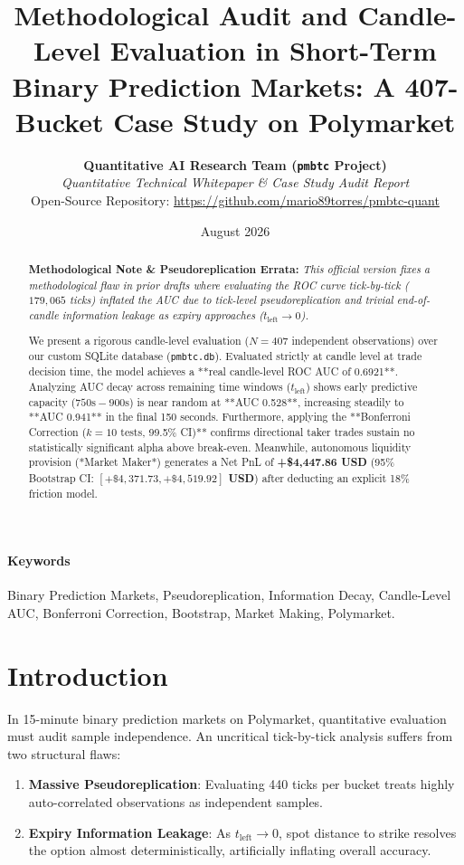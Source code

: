 \documentclass[10pt,twocolumn]{article}
\title{\textbf{Methodological Audit and Candle-Level Evaluation in Short-Term Binary Prediction Markets: A 407-Bucket Case Study on Polymarket}}
\author{\textbf{Quantitative AI Research Team (\texttt{pmbtc} Project)} \\
\textit{Quantitative Technical Whitepaper \& Case Study Audit Report} \\
Open-Source Repository: \url{https://github.com/mario89torres/pmbtc-quant}}
\date{August 2026}
\begin{document}
\maketitle

\begin{abstract}
\noindent \textbf{Methodological Note \& Pseudoreplication Errata:} \textit{This official version fixes a methodological flaw in prior drafts where evaluating the ROC curve tick-by-tick ($179,065$ ticks) inflated the AUC due to tick-level pseudoreplication and trivial end-of-candle information leakage as expiry approaches ($t_{\text{left}} \to 0$).}

We present a rigorous candle-level evaluation ($N=407$ independent observations) over our custom SQLite database (\texttt{pmbtc.db}). Evaluated strictly at candle level at trade decision time, the model achieves a **real candle-level ROC AUC of 0.6921**. Analyzing AUC decay across remaining time windows ($t_{\text{left}}$) shows early predictive capacity ($750\text{s}-900\text{s}$) is near random at **AUC 0.528**, increasing steadily to **AUC 0.941** in the final 150 seconds. Furthermore, applying the **Bonferroni Correction ($k=10$ tests, 99.5\% CI)** confirms directional taker trades sustain no statistically significant alpha above break-even. Meanwhile, autonomous liquidity provision (*Market Maker*) generates a Net PnL of \textbf{+\$4,447.86 USD} (95\% Bootstrap CI: \textbf{$[+\$4,371.73, +\$4,519.92]$ USD}) after deducting an explicit 18\% friction model.
\end{abstract}

\paragraph{\textbf{Keywords}} Binary Prediction Markets, Pseudoreplication, Information Decay, Candle-Level AUC, Bonferroni Correction, Bootstrap, Market Making, Polymarket.

\section{Introduction}
In 15-minute binary prediction markets on Polymarket, quantitative evaluation must audit sample independence. An uncritical tick-by-tick analysis suffers from two structural flaws:
\begin{enumerate}
    \item \textbf{Massive Pseudoreplication}: Evaluating 440 ticks per bucket treats highly auto-correlated observations as independent samples.
    \item \textbf{Expiry Information Leakage}: As $t_{\text{left}} \to 0$, spot distance to strike resolves the option almost deterministically, artificially inflating overall accuracy.
\end{enumerate}
\end{document}
